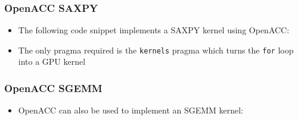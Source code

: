 \subsubsection{OpenACC SAXPY}\label{openacc-saxpy}

\begin{itemize}
\itemsep1pt\parskip0pt
\item
  The following code snippet implements a SAXPY kernel using OpenACC:
\end{itemize}

\begin{Shaded}
\begin{Highlighting}[]

        
   \NormalTok{(} 
\NormalTok{\}}
\end{Highlighting}
\end{Shaded}

\begin{itemize}
\itemsep1pt\parskip0pt
\item
  The only pragma required is the \texttt{kernels} pragma which turns
  the \texttt{for} loop into a GPU kernel
\end{itemize}

\subsubsection{OpenACC SGEMM}\label{openacc-sgemm}

\begin{itemize}
\itemsep1pt\parskip0pt
\item
  OpenACC can also be used to implement an SGEMM kernel:
\end{itemize}

